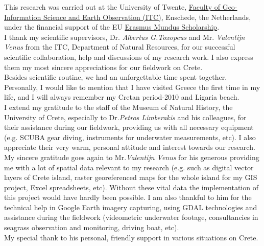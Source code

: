 \documentclass[11pt]{article}
\begin{document}
This research was carried out at the University of Twente, \href{http://www.itc.nl/}{Faculty of Geo-Information Science and Earth Observation (ITC)}, Enschede, the Netherlands, under the financial support of the EU \href{http://ec.europa.eu/education/external-relation-programmes/doc72_en.htm}{Erasmus Mundus Scholarship}. 
\vspace{1mm}\\
I thank my scientific supervisors, Dr. \textit{Albertus G.Toxopeus}  and Mr. \textit{Valentijn Venus} from the ITC, Department of Natural Resources, for our successful scientific collaboration, help and discussions of my research work. 
I also express them my most sincere appreciations for our fieldwork on Crete. \\ Besides scientific routine, we had an unforgettable time spent together. \\ Personally, I would like to mention that I have visited Greece the first time in my life, and I will always remember my Cretan period-2010 and Ligaria beach.\vspace{1mm}\\
I extend my gratitude to the staff of the Museum of Natural History, the University of Crete, especially to Dr.\textit{Petros Limberakis} and his colleagues, for their assistance during our fieldwork, providing us with all necessary equipment (e.g. SCUBA gear diving, instruments for underwater measurements, etc). I also appreciate their very warm, personal attitude and interest towards our research. 
\vspace{1mm}\\
My sincere gratitude goes again to Mr.\textit{Valentijn Venus} for his generous providing me with a lot of spatial data   relevant to my research (e.g. such as digital vector layers of Crete island, raster georeferenced maps for the whole island for my GIS project, Excel spreadsheets, etc). Without these vital data the implementation of this project would have hardly been possible. I am also thankful to him for the technical help in Google Earth imagery capturing, using GDAL technologies and assistance during the fieldwork (videometric underwater footage, consultancies in seagrass observation and monitoring, driving boat, etc). \\ My special thank to his personal, friendly support in various situations on Crete.\vspace{1mm}\\
\end{document}
